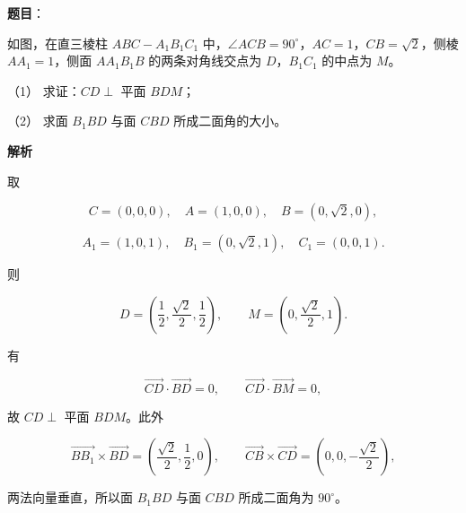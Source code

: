 \begin{answer}

\textbf{题目}：

如图，在直三棱柱 $ABC-A_1B_1C_1$ 中，$\angle ACB=90^\circ$，$AC=1$，$CB=\sqrt2$，侧棱 $AA_1=1$，侧面 $AA_1B_1B$ 的两条对角线交点为 $D$，$B_1C_1$ 的中点为 $M$。
\nopagebreak[4]
\begin{center}\end{center}
\nopagebreak[4]
（1） 求证：$CD\perp$ 平面 $BDM$；

（2） 求面 $B_1BD$ 与面 $CBD$ 所成二面角的大小。

\textbf{解析}


取

\nopagebreak[4]
\[
C=(0,0,0),\quad A=(1,0,0),\quad B=(0,\sqrt2,0),
\]

\nopagebreak[4]
\[
A_1=(1,0,1),\quad B_1=(0,\sqrt2,1),\quad C_1=(0,0,1).
\]

则

\nopagebreak[4]
\[
D=\left(\frac12,\frac{\sqrt2}{2},\frac12\right),\qquad
M=\left(0,\frac{\sqrt2}{2},1\right).
\]

有

\nopagebreak[4]
\[
\overrightarrow{CD}\cdot\overrightarrow{BD}=0,\qquad
\overrightarrow{CD}\cdot\overrightarrow{BM}=0,
\]

故 $CD\perp$ 平面 $BDM$。此外


\nopagebreak[4]
\[
\overrightarrow{BB_1}\times\overrightarrow{BD}
=\left(\frac{\sqrt2}{2},\frac12,0\right),
\qquad
\overrightarrow{CB}\times\overrightarrow{CD}
=\left(0,0,-\frac{\sqrt2}{2}\right),
\]

两法向量垂直，所以面 $B_1BD$ 与面 $CBD$ 所成二面角为 $90^\circ$。



\end{answer}
